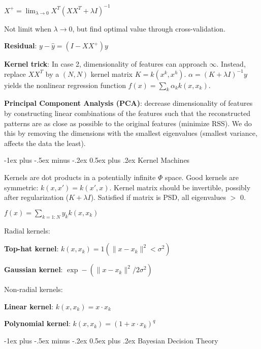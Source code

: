\documentclass[10pt,landscape]{article}
\makeatletter
\renewcommand{\section}{\@startsection{section}{1}{0mm}%
                                {-1ex plus -.5ex minus -.2ex}%
                                {0.5ex plus .2ex}%
                                {\normalfont\large\bfseries}}
\makeatother
\begin{document}
\begin{multicols}{3}
$X^+ = \lim_{\lambda \rightarrow 0} X^T(XX^T + \lambda I)^{-1}$

Not limit when $\lambda \rightarrow 0$, but find optimal value through cross-validation.

\textbf{Residual}: $y-\hat{y} = (I-XX^+)y$

\textbf{Kernel trick}: In case 2, dimensionality of features can approach $\infty$. Instead, replace $XX^T$ by a $(N, N)$ kernel matrix $K = k(x^k, x^h)$. $\alpha = (K + \lambda I)^{-1} y$ yields the nonlinear regression function $f(x) = \sum_k \alpha_k k(x, x_k)$.

\textbf{Principal Component Analysis (PCA)}: decrease dimensionality of features by constructing linear combinations of the features such that the reconstructed patterns are as close as possible to the original features (minimize RSS). We do this by removing the dimensions with the smallest eigenvalues (smallest variance, affects the data the least).


\section{Kernel Machines}

Kernels are dot products in a potentially infinite $\Phi$ space.
Good kernels are symmetric: $k(x, x') = k(x', x)$.
Kernel matrix should be invertible, possibly after regularization ($K+\lambda I$). Satisfied if matrix is PSD, all eigenvalues $>$ 0.

$f(x) = \sum_{k=1:N} y_k k(x, x_k)$

Radial kernels:

\textbf{Top-hat kernel}: $k(x, x_k) = 1(\lVert x - x_k \rVert^2 < \sigma^2)$

\textbf{Gaussian kernel}: $\exp -(\lVert x - x_k \rVert^2 / 2\sigma^2)$

Non-radial kernels:

\textbf{Linear kernel}: $k(x, x_k) = x \cdot x_k$

\textbf{Polynomial kernel}: $k(x, x_k) = (1 + x \cdot x_k)^q$


\section{Bayesian Decision Theory}


\end{multicols}
\end{document}
